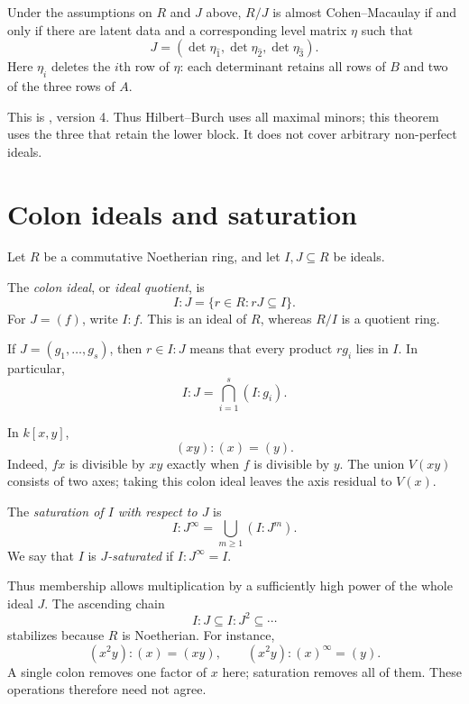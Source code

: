 \begin{theorem}
\label{theorem-bf-rs}
Under the assumptions on $R$ and $J$ above,
$R/J$ is almost Cohen--Macaulay if and
only if there are latent data and a
corresponding level matrix $\eta$ such that
$$
J=(\det\eta_{\widehat1},
   \det\eta_{\widehat2},
   \det\eta_{\widehat3}).
$$
Here $\eta_{\widehat i}$ deletes the $i$th
row of $\eta$: each determinant retains
all rows of $B$ and two of the three rows
of $A$.
\end{theorem}

This is \cite[Theorem 1.3, Setup 1.1 and
Definition 1.2]{bf-rs-2026}, version 4.
Thus Hilbert--Burch uses all maximal
minors; this theorem uses the three that
retain the lower block. It does not cover
arbitrary non-perfect ideals.


\section{Colon ideals and saturation}
\label{section-colon-ideals-saturation}

Let $R$ be a commutative Noetherian ring,
and let $I,J\subseteq R$ be ideals.

\begin{definition}
\label{definition-colon-ideal}
The \textit{colon ideal}, or
\textit{ideal quotient}, is
$$
I:J=\{r\in R:rJ\subseteq I\}.
$$
For $J=(f)$, write $I:f$.
This is an ideal of $R$, whereas $R/I$
is a quotient ring.
\end{definition}

If $J=(g_1,\ldots,g_s)$, then $r\in I:J$
means that every product $rg_i$ lies in
$I$. In particular,
$$
I:J=\bigcap_{i=1}^s(I:g_i).
$$

\begin{example}
\label{example-colon-two-lines}
In $k[x,y]$,
$$
(xy):(x)=(y).
$$
Indeed, $fx$ is divisible by $xy$ exactly
when $f$ is divisible by $y$.
The union $V(xy)$ consists of two axes;
taking this colon ideal leaves the axis
residual to $V(x)$.
\end{example}

\begin{definition}
\label{definition-ideal-saturation}
The \textit{saturation of $I$ with
respect to $J$} is
$$
I:J^\infty=\bigcup_{m\geq1}(I:J^m).
$$
We say that $I$ is \textit{$J$-saturated}
if $I:J^\infty=I$.
\end{definition}

Thus membership allows multiplication
by a sufficiently high power of the
whole ideal $J$. The ascending chain
$$
I:J\subseteq I:J^2\subseteq\cdots
$$
stabilizes because $R$ is Noetherian.
For instance,
$$
(x^2y):(x)=(xy),
\qquad
(x^2y):(x)^\infty=(y).
$$
A single colon removes one factor of
$x$ here; saturation removes all of them.
These operations therefore need not agree.

